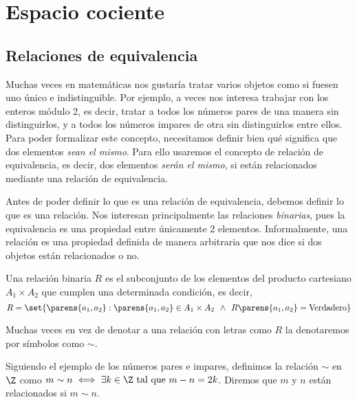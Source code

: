 \documentclass[../algebra_lineal.tex]{subfiles}
\begin{document}
\section{Espacio cociente}

\subsection{Relaciones de equivalencia}

Muchas veces en matemáticas nos gustaría tratar varios objetos como si fuesen uno único e indistinguible. Por ejemplo, a veces nos interesa trabajar con los enteros módulo 2, es decir, tratar a todos los números pares de una manera sin distinguirlos, y a todos los números impares de otra sin distinguirlos entre ellos. Para poder formalizar este concepto, necesitamos definir bien qué significa que dos elementos \textit{sean el mismo}. Para ello usaremos el concepto de relación de equivalencia, es decir, dos elementos \textit{serán el mismo}, si están relacionados mediante una relación de equivalencia.

Antes de poder definir lo que es una relación de equivalencia, debemos definir lo que es una relación. Nos interesan principalmente las relaciones \textit{binarias}, pues la equivalencia es una propiedad entre únicamente 2 elementos. Informalmente, una relación es una propiedad definida de manera arbitraria que nos dice si dos objetos están relacionados o no.

\begin{definition}
    Una relación binaria $R$ es el subconjunto de los elementos del producto cartesiano $A_1 \times A_2$ que cumplen una determinada condición, es decir,
    \[
        R = \set{\parens{a_1, a_2} : \parens{a_1, a_2} \in A_1 \times A_2 \spc \land \spc R \parens{a_1, a_2} = \mathrm{Verdadero}}
    \]
\end{definition}

\begin{notation}
    Muchas veces en vez de denotar a una relación con letras como $R$ la denotaremos por símbolos como $\sim$. 
\end{notation}

\begin{example}
    \label{relacion_modulo_2}
    Siguiendo el ejemplo de los números pares e impares, definimos la relación $\sim$ en $\Z$ como $m \sim n \iff \exists k \in \Z \st m - n = 2k $. Diremos que $m$ y $n$ están relacionados si $m \sim n$.
\end{example}
\end{document}
